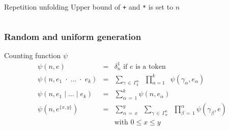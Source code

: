 \documentclass[9pt]{beamer}
\newcommand{\code}[1]{\texttt{#1}}
\begin{document}
\begin{frame}[t]
\begin{columns}[t]
\begin{column}{.4\textwidth}
\begin{block}{Repetition unfolding}
Upper bound of \code{+} and \code{*} is set to $n$
\end{block}
\end{column}

\end{columns}

\end{frame}

\begin{frame}
\frametitle{Random and uniform generation}

\begin{block}{Counting function $\psi$}
\begin{eqnarray*}
\psi(n, e) & = & \delta_n^1 \text{ \ \ if $e$ is a token} \\
\psi(n, e_1 \;\cdot\; \dots \;\cdot\; e_k) & = & \sum_{\gamma \,\in\, \Gamma_k^n}\;\;
                                                 \prod_{\alpha = 1}^k\;\;
                                                 \psi(\gamma_\alpha, e_\alpha) \\
\psi(n, e_1 \;\vert\; \dots \;\vert\; e_k) & = & \sum_{\alpha\,=\,1}^k
                                                 \psi(n, e_\alpha) \\
\psi(n, e^{\{x,y\}}) & = & \sum_{\alpha\,=\,x}^y\;\;
                           \sum_{\gamma \,\in\, \Gamma_\alpha^n}\;\;
                           \prod_{\beta\,=\,1}^\alpha \psi(\gamma_\beta, e) \\
                     &   & \text{with $0 \le x \le y$}
\end{eqnarray*}
\end{block}

\end{frame}
\end{document}
